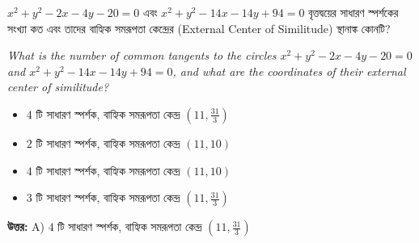 \documentclass[12pt, a4paper]{article}
\begin{document}
\begin{tcolorbox}[questionbox={প্রশ্ন (Question) 1}]
    \noindent
    $x^2 + y^2 - 2x - 4y - 20 = 0$ এবং $x^2 + y^2 - 14x - 14y + 94 = 0$ বৃত্তদ্বয়ের সাধারণ স্পর্শকের সংখ্যা কত এবং তাদের বাহ্যিক সমরূপতা কেন্দ্রের (External Center of Similitude) স্থানাঙ্ক কোনটি?
    
    \vspace{0.8em}
    \begin{english}
    \noindent\textit{\color{darkgray}
    What is the number of common tangents to the circles $x^2 + y^2 - 2x - 4y - 20 = 0$ and $x^2 + y^2 - 14x - 14y + 94 = 0$, and what are the coordinates of their external center of similitude?
    }
    \end{english}
\end{tcolorbox}

\begin{itemize}[label={}, leftmargin=1cm, itemsep=0.5em]
    \item[\textbf{A)}] $4$ টি সাধারণ স্পর্শক, বাহ্যিক সমরূপতা কেন্দ্র $(11, \frac{31}{3})$
    \item[\textbf{B)}] $2$ টি সাধারণ স্পর্শক, বাহ্যিক সমরূপতা কেন্দ্র $(11, 10)$
    \item[\textbf{C)}] $4$ টি সাধারণ স্পর্শক, বাহ্যিক সমরূপতা কেন্দ্র $(11, 10)$
    \item[\textbf{D)}] $3$ টি সাধারণ স্পর্শক, বাহ্যিক সমরূপতা কেন্দ্র $(11, \frac{31}{3})$
\end{itemize}

\vspace{0.5em}
\begin{tcolorbox}[answerbox]
    \textbf{\color{success} উত্তর:} A) $4$ টি সাধারণ স্পর্শক, বাহ্যিক সমরূপতা কেন্দ্র $(11, \frac{31}{3})$
\end{tcolorbox}
\vspace{1em}
\end{document}

